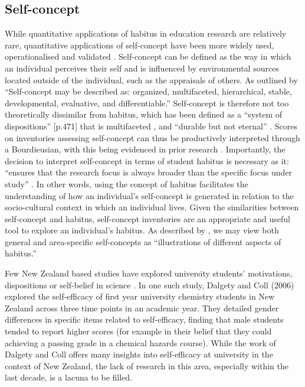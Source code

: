 \subsection*{Self-concept}
\label{selfconcept}
While quantitative applications of habitus in education research are relatively rare, quantitative applications of self-concept have been more widely used, operationalised and validated \cite{marsh2014academic,hattie2014self}. Self-concept can be defined as the way in which an individual perceives their self \cite{rosenberg1979conceiving,shavelson1976self} and is influenced by environmental sources located outside of the individual, such as the appraisals of others. As outlined by \cite[p.488]{shavelson1976self} ``Self-concept may be described as: organized, multifaceted, hierarchical, stable, developmental, evaluative, and differentiable.'' Self-concept is therefore not too theoretically dissimilar from habitus, which has been defined as a ``system of dispositions'' [p.471] that is multifaceted \cite{Nash1999}, and ``durable but not eternal'' \cite{Bourdieu1984}. Scores on inventories assessing self-concept can thus be productively interpreted through a Bourdieusian, with this being evidenced in prior research \cite{dumais2002cultural}.  Importantly, the decision to interpret self-concept in terms of student habitus is necessary as it: ``ensures that the research focus is always broader than the specific focus under study'' \cite{Reay_2004}. In other words, using the concept of habitus facilitates the understanding of how an individual's self-concept is generated in relation to the socio-cultural context in which an individual lives. Given the similarities between self-concept and habitus, self-concept inventories are an appropriate and useful tool to explore an individual's habitus. As described by \cite[p.395]{bodovski2014adolescents}, we may view both general and area-specific self-concepts as ``illustrations of different aspects of habitus.''  

Few New Zealand based studies have explored university students' motivations, dispositions or self-belief in science \cite{dalgety2006exploring,murphy2018determinants}. In one such study, Dalgety and Coll (2006) \cite{dalgety2006exploring} explored the self-efficacy of first year university chemistry students in New Zealand across three time points in an academic year. They detailed gender differences in specific items related to self-efficacy, finding that male students tended to report higher scores (for example in their belief that they could achieving a passing grade in a chemical hazards course). While the work of Dalgety and Coll offers many insights into self-efficacy at university in the context of New Zealand, the lack of research in this area, especially within the last decade, is a lacuna to be filled. 


